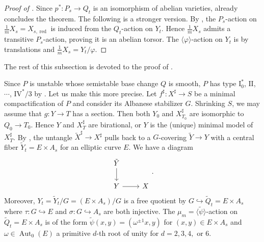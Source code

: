 \documentclass[reqno, letterpaper]{amsart}
\numberwithin{equation}{subsection}
\let\to\longrightarrow
\DeclareMathOperator{\Aut}{Aut}
\DeclareMathOperator{\red}{red}
\begin{document}
		\begin{proof} [Proof of ]
			Since $p^* : P_s \to Q_t$ is an isomorphism of abelian varieties,  already concludes the theorem. The following is a stronger version. By , the $P_s$-action on $\frac{1}{m} X_s = X_{s, \red}$ is induced from the $Q_t$-action on $Y_t$. Hence $\frac{1}{m}X_s$ admits a transitive $P_s$-action, proving it is an abelian torsor. The $\langle \varphi \rangle$-action on $Y_t$ is by translations and $\frac{1}{m} X_s = Y_t / \varphi$.
		\end{proof}
		
		The rest of this subsection is devoted to the proof of .
		
		\medskip
		
		Since $P$ is unstable whose semistable base change $Q$ is smooth, $P$ has type $\mathrm I_0^*$, $\mathrm{II}$, $\cdots$, $\mathrm{IV}^*/3$ by . Let us make this more precise. Let $f^\sharp : X^\sharp \to S$ be a minimal compactification of $P$ and consider its Albanese stabilizer $G$. Shrinking $S$, we may assume that $g : Y \to T$ has a section. Then both $Y_0$ and $X^\sharp_{T_0}$ are isomorphic to $Q_0 \to T_0$. Hence $Y$ and $X^\sharp_T$ are birational, or $Y$ is the (unique) minimal model of $X^\sharp_T$. By , the untangle $\tilde X^\sharp \to X^\sharp$ pulls back to a $G$-covering $\tilde Y \to Y$ with a central fiber $\tilde Y_t = E \times A_s$ for an elliptic curve $E$. We have a diagram
		\begin{equation} \label{diag:multiple fiber ii:untangle of Y}
		\begin{tikzcd}
			\tilde Y \arrow[d] \\
			Y \arrow[r] & X
		\end{tikzcd}.
		\end{equation}
		Moreover, $Y_t = \tilde Y_t / G = (E \times A_s)/G$ is a free quotient by $G \hookrightarrow \tilde Q_t = E \times A_s$ where $\tau : G \hookrightarrow E$ and $\sigma : G \hookrightarrow A_s$ are both injective. The $\mu_m = \langle \tilde \psi \rangle$-action on $\tilde Q_t = E \times A_s$ is of the form $\tilde \psi (x,y) = (\omega^{\pm1} x ,y)$ for $(x,y) \in E \times A_s$ and $\omega \in \Aut_0(E)$ a primitive $d$-th root of unity for $d = 2,3,4,$ or $6$.
		
		\medskip
		
\end{document}
